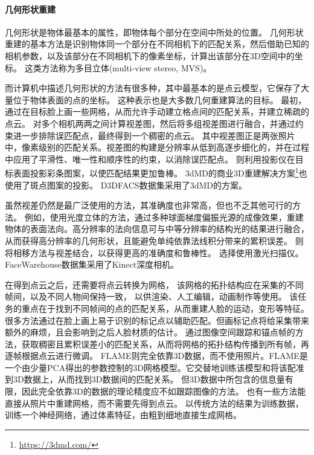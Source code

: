 \paragraph{几何形状重建}
几何形状是物体最基本的属性，即物体每个部分在空间中所处的位置。
几何形状重建的基本方法是识别物体同一个部分在不同相机下的匹配关系，然后借助已知的相机参数，以及该部分在不同相机下的像素坐标，计算出该部分在3D空间中的坐标。
这类方法称为多目立体(multi-view stereo, MVS)。

而计算机中描述几何形状的方法有很多种，其中最基本的是点云模型，它保存了大量位于物体表面的点的坐标。
这种表示也是大多数几何重建算法的目标。
最初，\citet{PFM}通过在目标脸上画一些网格，从而允许手动建立格点间的匹配关系，并建立稀疏的点云。
\citet{ss_geo}对多个相机两两之间计算视差图，然后将多组视差图进行融合，并通过约束进一步排除误匹配点，最终得到一个稠密的点云。
其中视差图正是两张照片中，像素级别的匹配关系。视差图的构建是分辨率从低到高逐步细化的，并在过程中应用了平滑性、唯一性和顺序性的约束，以消除误匹配点。
\citet{DEP}则利用投影仪在目标表面投影彩条图案，以使匹配结果更加鲁棒。
3dMD的商业3D重建解决方案\footnote{\url{https://3dmd.com/}}也使用了斑点图案的投影。
D3DFACS\citep{D3DFACS}数据集采用了3dMD的方案。

虽然视差仍然是最广泛使用的方法，其准确度也非常高，但也不乏其他可行的方法。
例如，\citet{MaHPCWD07}使用光度立体的方法，通过多种球面梯度偏振光源的成像效果，重建物体的表面法向。高分辨率的法向信息可与中等分辨率的结构光的结果进行融合，从而获得高分辨率的几何形状，且能避免单纯依靠法线积分带来的累积误差。
\citet{phase_shift}则将相移方法与视差结合，以获得更高的准确度和鲁棒性。
\citet{BJUT3D}选择使用激光扫描仪。
FaceWarehouse\citep{FaceWarehouse}数据集采用了Kinect深度相机。

在得到点云之后，还需要将点云转换为网格，
该网格的拓扑结构应在采集的不同帧间，以及不同人物间保持一致，
以供渲染、人工编辑，动画制作等使用。
该任务的重点在于找到不同帧间的点的匹配关系，从而重建人脸的运动，变形等特征。
很多方法\citep{PFM,DEP,BickelBAMOPG07}通过在脸上画上易于识别的标记点以辅助匹配。但画标记点将给采集带来额外的麻烦，且会影响到之后人脸材质的估计。
\citet{BeelerHBBBGSG11}通过图像空间跟踪和锚点帧的方法，获取稠密且累积误差小的匹配关系，从而将网格的拓扑结构传播到所有帧，再逐帧根据点云进行微调。
FLAME\citep{FLAME}则完全依靠3D数据，而不使用照片。FLAME是一个由少量PCA得出的参数控制的3D网格模型。它交替地训练该模型和将该配准到3D数据上，从而找到3D数据间的匹配关系。
但3D数据中所包含的信息量有限，因此完全依靠3D的数据的理论精度应不如跟踪图像的方法。
也有一些方法能直接从照片中重建网格，而不需要先得到点云。
\citet{LiLBL0Z21}以传统方法的结果为训练数据，训练一个神经网络，通过体素特征，由粗到细地直接生成网格。

